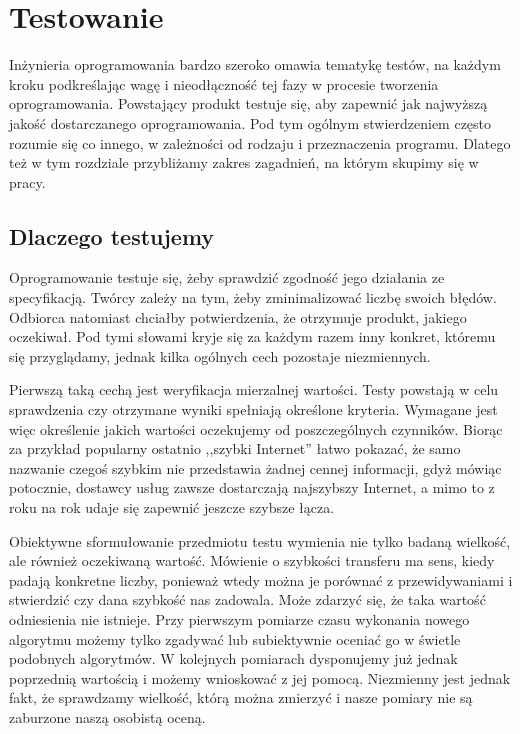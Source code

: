 \documentclass[00-praca-magisterska.tex]{subfiles}
\begin{document}
\chapter{Testowanie}

Inżynieria oprogramowania bardzo szeroko omawia tematykę testów, na każdym
kroku podkreślając wagę i nieodłączność tej fazy w procesie tworzenia
oprogramowania.  Powstający produkt testuje się, aby zapewnić jak najwyższą
jakość dostarczanego oprogramowania. Pod tym ogólnym stwierdzeniem często
rozumie się co innego, w zależności od rodzaju i przeznaczenia programu.
Dlatego też w tym rozdziale przybliżamy zakres zagadnień, na którym skupimy się
w pracy.

\section{Dlaczego testujemy}

Oprogramowanie testuje się, żeby sprawdzić zgodność jego działania ze specyfikacją. Twórcy
zależy na tym, żeby zminimalizować liczbę swoich błędów. Odbiorca natomiast
chciałby potwierdzenia, że otrzymuje produkt, jakiego oczekiwał. Pod tymi
słowami kryje się za każdym razem inny konkret, któremu się przyglądamy, jednak
kilka ogólnych cech pozostaje niezmiennych.

Pierwszą taką cechą jest weryfikacja mierzalnej wartości. Testy powstają w celu
sprawdzenia czy otrzymane wyniki spełniają określone kryteria. Wymagane jest
więc określenie jakich wartości oczekujemy od poszczególnych czynników. Biorąc
za przykład popularny ostatnio ,,szybki Internet'' łatwo pokazać, że samo
nazwanie czegoś szybkim nie przedstawia żadnej cennej informacji, gdyż mówiąc
potocznie, dostawcy usług zawsze dostarczają najszybszy Internet, a mimo to z
roku na rok udaje się zapewnić jeszcze szybsze łącza. 

Obiektywne sformułowanie przedmiotu testu wymienia nie tylko badaną wielkość,
ale również oczekiwaną wartość. Mówienie o szybkości transferu ma sens, kiedy
padają konkretne liczby, ponieważ wtedy można je porównać z przewidywaniami i
stwierdzić czy dana szybkość nas zadowala. Może zdarzyć się, że taka wartość
odniesienia nie istnieje. Przy pierwszym pomiarze czasu wykonania nowego
algorytmu możemy tylko zgadywać lub subiektywnie oceniać go w świetle podobnych
algorytmów. W kolejnych pomiarach dysponujemy już jednak poprzednią wartością i
możemy wnioskować z jej pomocą. Niezmienny jest jednak fakt, że sprawdzamy
wielkość, którą można zmierzyć i nasze pomiary nie są zaburzone naszą osobistą
oceną.
\end{document}
